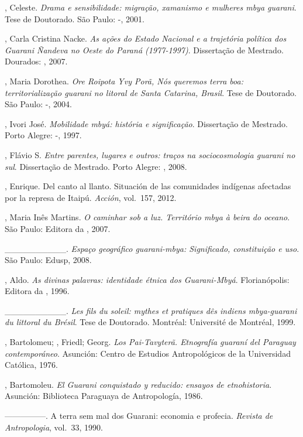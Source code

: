 \begin{Parskip}
, Celeste. \emph{Drama e sensibilidade: migração, xamanismo e
mulheres mbya guarani}. Tese de Doutorado. São Paulo: -, 2001.

, Carla Cristina Nacke. \emph{As ações do Estado Nacional e a
trajetória política dos Guarani Ñandeva no Oeste do Paraná (1977-1997)}.
Dissertação de Mestrado. Dourados: , 2007.

, Maria Dorothea. \emph{Ore Roipota Yvy Porã, Nós queremos terra boa:
territorialização guarani no litoral de Santa Catarina, Brasil}. Tese de
Doutorado. São Paulo: -, 2004.

, Ivori José.  \emph{Mobilidade mbyá: história e significação}.
Dissertação de Mestrado. Porto Alegre: -, 1997.

, Flávio S. \emph{Entre parentes, lugares e outros: traços na
sociocosmologia guarani no sul}. Dissertação de Mestrado. Porto Alegre:
, 2008.

, Enrique. Del canto al llanto. Situación de las comunidades
indígenas afectadas por la represa de Itaipú. \emph{Acción}, vol.~157, 2012.

, Maria Inês Martins. \emph{O caminhar sob a luz. Território mbya à
beira do oceano}. São Paulo: Editora da , 2007.

\_\_\_\_\_\_\_\_\_\_. \emph{Espaço geográfico guarani-mbya: Significado,
constituição e uso}. São Paulo: Edusp, 2008.

, Aldo. \emph{As divinas palavras: identidade étnica dos Guarani-Mbyá}.
Florianópolis: Editora da , 1996.

\_\_\_\_\_\_\_\_\_\_. \emph{Les fils du soleil: mythes et pratiques dês
indiens mbya-guarani du littoral du Brésil}. Tese de Doutorado.
Montréal: Université de Montréal, 1999.

, Bartolomeu; , Friedl;  Georg. \emph{Los Pai-Tavyterã.
Etnografía guaraní del Paraguay contemporáneo}. Asunción: Centro de
Estudios Antropológicos de la Universidad Católica, 1976.

, Bartomoleu. \emph{El Guarani conquistado y reducido: ensayos de
etnohistoria}. Asunción: Biblioteca Paraguaya de Antropología, 1986.

—————. A terra sem mal dos Guarani: economia e profecia. \emph{Revista de
Antropologia}, vol.~33, 1990. 


\end{Parskip}
